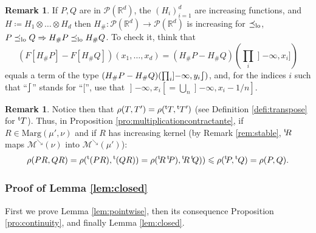 \documentclass[JEP,XML,SOM,Unicode,NoEqCountersInSection,NoFloatCountersInSection,published]{cedram}
\theoremstyle{plain}
\theoremstyle{definition}
\newtheorem{rem}[them]{Remark}
\newcommand{\trans}{{}^{\mathrm{t}}\mkern-1mu}
\newcommand{\eqdef}{\coloneqq}
\newcommand{\p}{\mathcal{P}}
\newcommand{\ma}{\mathrm{Marg}}
\newcommand{\R}{\mathbb{R}}
\newcommand{\mdec}{\mathcal{M}^{\scriptscriptstyle\searrow}}
\newcommand{\op}{\mathopen}
\newcommand{\clo}{\mathclose}
\newcommand{\leqlc}{\preceq_{\rm lo}}
\newcommand{\rsemibracket}{\mathclose{\rfloor\hspace*{-.9ex}\lceil}}
\begin{document}
\begin{rem}\label{rem:leqlc_et_Gs}If $P,Q$ are in $\p(\R^d)$, the $(H_i)_{i=1}^d$ are increasing functions, and $H\eqdef H_1\otimes\ldots\otimes H_d$ then $H_\#:\p(\R^d)\to\p(\R^d)$ is increasing for $\leqlc$, \ie $P\leqlc Q\Rightarrow H_\#P\leqlc H_\#Q$. To check it, think that\vspace*{-3pt}
\[\textstyle
(F[H_\#P]-F[H_\#Q])(x_1,\ldots,x_d)=(H_\#P-H_\#Q)(\prod_i\op]-\infty,x_i])
\]
equals a term of the type $(H_\#P-H_\#Q)(\prod_i\op]-\infty,y_i\rsemibracket)$, and, for the indices $i$ such that ``$\rsemibracket$'' stands for ``$[$'', use that $\op]-\infty,x_i\clo[=\bigcup_{n}\op]-\infty,x_i-1/n]$.
\end{rem}

\begin{rem}\label{rem:multiplicationcontractante} Notice then that $\rho(T,T')=\rho(\trans T,{\trans T'})$ (see Definition \ref{defi:transpose} for $\trans T$). Thus, in Proposition \ref{pro:multiplicationcontractante}, if $R\in\ma(\mu',\nu)$ and if $R$ has increasing kernel (\ie by Remark \ref{rem:stable}, $\trans\!R$ maps $\mdec(\nu)$ into $\mdec(\mu')$):\vspace*{-3pt}
\[\rho(PR,QR)=\rho(\trans(PR),{\trans (QR)})=\rho(\trans\!R\,\trans\!P),{\trans\!R\,\trans\!Q)})\leqslant\rho(\trans\!P,\trans Q)=\rho(P,Q).\]
\end{rem}

\subsubsection{Proof of Lemma \ref{lem:closed}}\label{subsec:MaInProcess}
First we prove Lemma \ref{lem:pointwise}, then its consequence Proposition \ref{pro:continuity}, and finally Lemma \ref{lem:closed}.
\end{document}
